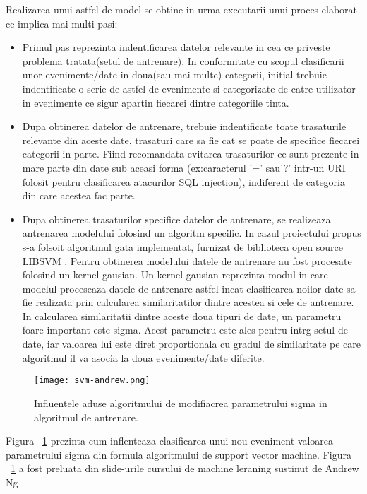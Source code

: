 Realizarea unui astfel de model se obtine in urma executarii unui proces elaborat ce implica mai multi pasi:
\begin{itemize}
	\item  Primul pas reprezinta indentificarea datelor relevante in cea ce priveste problema tratata(setul de antrenare). In conformitate cu scopul clasificarii unor evenimente/date in doua(sau mai multe) categorii, initial trebuie indentificate o serie de astfel de evenimente si categorizate de catre utilizator in evenimente ce sigur apartin fiecarei dintre categoriile tinta.
	\item Dupa  obtinerea datelor de antrenare, trebuie indentificate toate trasaturile relevante din aceste date, trasaturi care sa fie cat se poate de specifice fiecarei categorii in parte. Fiind recomandata evitarea trasaturilor ce sunt prezente in mare parte din date sub aceasi forma (ex:caracterul '=' sau'?' intr-un URI folosit pentru clasificarea atacurilor SQL injection), indiferent de categoria din care acestea fac parte.
	\item Dupa obtinerea trasaturilor specifice datelor de antrenare, se realizeaza antrenarea modelului folosind un algoritm specific. In cazul proiectului propus s-a folsoit algoritmul gata implementat, furnizat de biblioteca open source LIBSVM \cite{libsvm}. Pentru obtinerea modelului datele de antrenare au fost procesate folosind un kernel gausian. Un kernel gausian reprezinta modul in care modelul proceseaza datele de antrenare astfel incat clasificarea noilor date sa fie realizata prin calcularea similaritatilor dintre acestea si cele de antrenare. In calcularea similaritatii dintre aceste doua tipuri de date, un parametru foare important este sigma. Acest parametru este ales pentru intrg setul de date, iar valoarea lui este diret proportionala cu gradul de similaritate pe care algoritmul il va asocia la doua evenimente/date diferite.
\end{itemize}



\begin{figure}[h]
	\centering
	\texttt{[image: svm-andrew.png]}
	\caption{Influentele aduse algoritmului de modifiacrea parametrului sigma in algoritmul de antrenare.}
	\label{fig:rev-proxy}
\end{figure}

Figura ~\ref{fig:rev-proxy} prezinta cum inflenteaza clasificarea unui nou eveniment valoarea parametrului sigma din formula algoritmului de support vector machine. Figura ~\ref{fig:rev-proxy} a fost preluata din slide-urile cursului de machine leraning sustinut de Andrew Ng \cite{andrew_ng} \\


